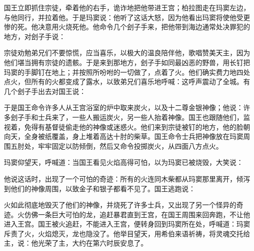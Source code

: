 国王立即抓住宗徒，牵着他的右手，诡诈地把他带进王宫；柏拉图走在玛窦左边，与他同行，并拉着他。于是玛窦说：他听了这话大怒，因为他看出玛窦将使他受更惨的死。他决意用火烧死他。他命令几个刽子手来，把他带到海边通常处决罪犯的地方，对刽子手说：\par

宗徒劝勉弟兄们不要惊慌，应当喜乐，以极大的温良陪伴他，歌唱赞美天主，因为他们堪当拥有宗徒的遗骸。于是来到那地方，刽子手如同最凶恶的野兽，用长钉把玛窦的手脚钉在地上；并按照所吩咐的一切做了，点着了火。他们确实费力地四处点火，但所有的火都变成了露水，以致弟兄们喜乐地呼喊：这呼声震动了全城。有几个刽子手出去对国王说：\par

于是国王命令许多人从王宫浴室的炉中取来炭火，以及十二尊金银神像；他说：许多刽子手和士兵来了，一些人搬运炭火，另一些人抬着神像。国王也跟随他们，监视着，免得有基督徒偷走他的神像或迷惑火。他们来到宗徒被钉的地方，他的脸朝向天，全身被纸覆盖，身上堆着高达十肘的柴草。国王命令士兵把神像放在玛窦周围五肘处，牢牢固定以防倾倒，然后又命令投掷炭火，从四面八方点火。\par

玛窦仰望天，呼喊道：当国王看见火焰高得可怕，以为玛窦已被烧毁，大笑说：\par

他说这话时，出现了一个可怕的奇迹：所有的火连同木柴都从玛窦那里离开，倾泻到他们的神像周围，以致金子和银子都看不见了。国王逃跑说：\par

火如此彻底地毁灭了他们的神像，并烧死了许多士兵，又出现了另一个怪异的奇迹。火仿佛一条巨大可怕的龙，追赶暴君直到王宫，在国王周围来回奔跑，不让他进入王宫。国王被火追赶，不能进入王宫，便转身回到玛窦所在处，呼喊道：玛窦斥责了火，火焰熄灭，龙也隐没了。他举目望天，用希伯来语祈祷，将灵魂交托给主，说：他光荣了主，大约在第六时辰安息了。\par

